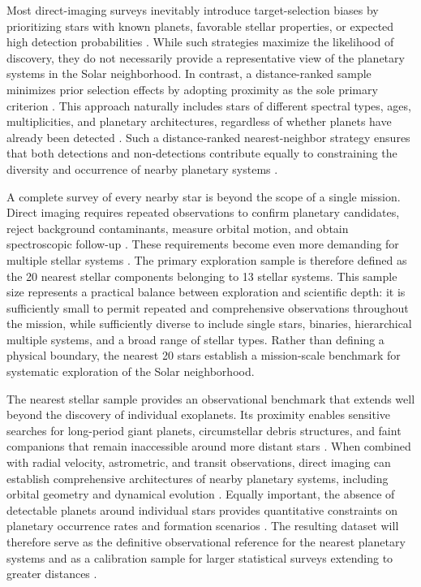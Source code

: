 Most direct-imaging surveys inevitably introduce target-selection biases by prioritizing stars with known planets, favorable stellar properties, or expected high detection probabilities \cite{Nielsen2019}. 
While such strategies maximize the likelihood of discovery, they do not necessarily provide a representative view of the planetary systems in the Solar neighborhood. In contrast, a distance-ranked sample minimizes prior selection effects by adopting proximity as the sole primary criterion \cite{Henry2018}. 
This approach naturally includes stars of different spectral types, ages, multiplicities, and planetary architectures, regardless of whether planets have already been detected \cite{Henry2018}. 
Such a distance-ranked nearest-neighbor strategy ensures that both detections and non-detections contribute equally to constraining the diversity and occurrence of nearby planetary systems \cite{Bowler2016}.

A complete survey of every nearby star is beyond the scope of a single mission. Direct imaging requires repeated observations to confirm planetary candidates, reject background contaminants, measure orbital motion, and obtain spectroscopic follow-up \cite{Currie2022}. 
These requirements become even more demanding for multiple stellar systems \cite{HabEx2020}. 
The primary exploration sample is therefore defined as the 20 nearest stellar components belonging to 13 stellar systems. This sample size represents a practical
balance between exploration and scientific depth: it is sufficiently small to permit repeated and comprehensive observations throughout the mission, while sufficiently diverse to include single stars, binaries, hierarchical multiple systems, and a broad range of stellar types. Rather than defining a physical boundary, the nearest 20 stars establish a mission-scale benchmark for systematic exploration of the Solar neighborhood.

The nearest stellar sample provides an observational benchmark that extends well beyond the discovery of individual exoplanets. Its proximity enables sensitive searches for long-period giant planets, circumstellar debris structures, and faint companions that remain inaccessible around more distant stars \cite{Bowler2016}. 
When combined with radial velocity, astrometric, and transit observations, direct imaging can establish comprehensive architectures of nearby planetary systems, including orbital geometry and dynamical evolution \cite{LUVOIR2019}. 
Equally important, the absence of detectable planets around individual stars provides quantitative constraints on planetary occurrence rates and formation scenarios 
\cite{Bowler2016}. 
The resulting dataset will therefore serve as the definitive observational reference for the nearest planetary systems and as a calibration sample for larger statistical surveys extending to greater distances \cite{LUVOIR2019}.

